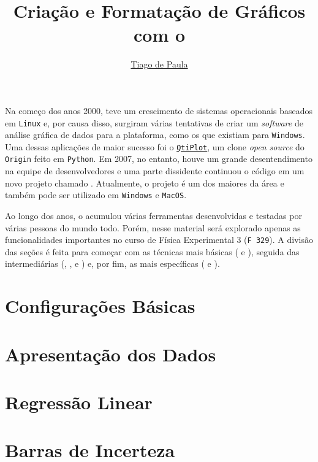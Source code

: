 \documentclass{article}
\title{Criação e Formatação de Gráficos com o}\softwarelogo
\author{\href{mailto:t187679@dac.unicamp.br}{Tiago de Paula}}
\date{}
\begin{document}
    \maketitle

    Na começo dos anos 2000, teve um crescimento de sistemas operacionais baseados em \texttt{Linux} e, por causa disso, surgiram várias tentativas de criar um \textit{software} de análise gráfica de dados para a plataforma, como os que existiam para \texttt{Windows}. Uma dessas aplicações de maior sucesso foi o \href{https://www.qtiplot.com/}{\texttt{QtiPlot}}, um clone \textit{open source} do \texttt{Origin} feito em \texttt{Python}. Em 2007, no entanto, houve um grande desentendimento na equipe de desenvolvedores e uma parte dissidente continuou o código em um novo projeto chamado \software. Atualmente, o projeto é um dos maiores da área e também pode ser utilizado em \texttt{Windows} e \texttt{MacOS}.

    Ao longo dos anos, o \software acumulou várias ferramentas desenvolvidas e testadas por várias pessoas do mundo todo. Porém, nesse material será explorado apenas as funcionalidades importantes no curso de Física Experimental 3 (\texttt{F 329}). A divisão das seções é feita para começar com as técnicas mais básicas ( e ), seguida das intermediárias (, ,  e ) e, por fim, as mais específicas ( e ).

    \section{Configurações Básicas} \label{sec:basico}

    \section{Apresentação dos Dados} \label{sec:reta}

    \section{Regressão Linear} \label{sec:regres}

    \section{Barras de Incerteza} \label{sec:incert}
\end{document}
